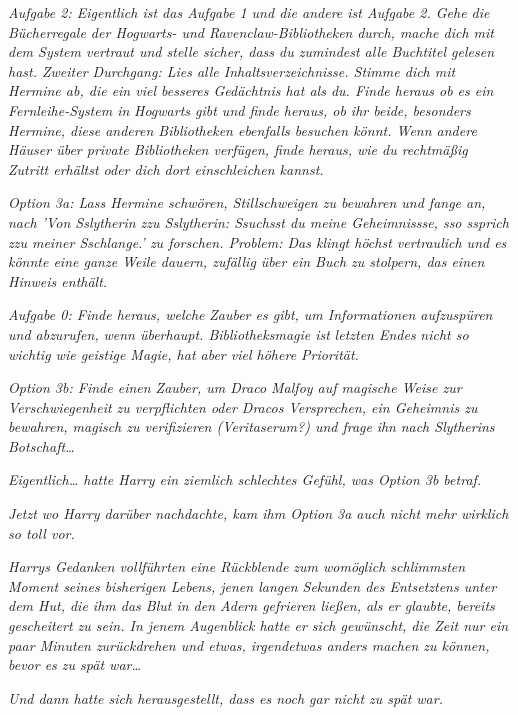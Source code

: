 {\emph{\emph{Aufgabe 2: Eigentlich ist das Aufgabe 1 und die andere ist Aufgabe 2. Gehe die Bücherregale der Hogwarts- und Ravenclaw-Bibliotheken}} \emph{\emph{durch}\emph{, mache dich mit dem System vertraut und stelle sicher, dass du zumindest alle Buchtitel gelesen hast. Zweiter Durchgang: Lies alle Inhaltsverzeichnisse. Stimme dich mit Hermine ab, die ein viel besseres Gedächtnis hat als du. Finde heraus ob es ein Fernleihe-System in}} \emph{\emph{Hogwarts gibt und finde heraus, ob ihr beide, besonders Hermine, diese anderen Bibliotheken ebenfalls besuchen könnt. Wenn andere Häuser über private Bibliotheken verfügen, finde heraus, wie du rechtmäßig Zutritt erhältst oder dich dort einschleichen kannst.}}

\emph{\emph{Option 3a: Lass Hermine schwören, Stillschweigen zu bewahren und fange an, nach '}\emph{V}\emph{on Sslytherin zzu Sslytherin: Ssuchsst du meine Geheimnissse, sso s}\emph{s}\emph{prich zzu meiner Sschlange.}\emph{' zu forschen. Problem: Das klingt höchst vertraulich und es könnte eine ganze Weile dauern, zufällig über ein Buch zu stolpern, das einen Hinweis enthält.}}

\emph{\emph{Aufgabe 0: Finde heraus, w}\emph{elche}} \emph{\emph{Zauber es gibt, um Informationen aufzuspüren und abzurufen,}} \emph{\emph{wenn überhaupt}\emph{. Bibliotheksmagie ist}} \emph{\emph{letzten Endes}} \emph{\emph{nicht so wichtig wie geistige Magie, hat aber viel höhere Priorität.}}

\emph{\emph{Option 3b: Finde einen Zauber, um Draco Malfoy auf magische Weise zur Verschwiegenheit zu verpflichten oder Dracos Versprechen, ein Geheimnis zu bewahren, magisch zu verifizieren (Veritaserum?) und frage}} \emph{ihn} \emph{\emph{nach Slytherins Botschaft…}}

\emph{Eigentlich… hatte Harry ein ziemlich schlechtes Gefühl, was Option 3b betraf.}

\emph{Jetzt wo Harry darüber nachdachte, kam ihm Option 3a auch nicht mehr wirklich so toll vor.}

\emph{Harrys Gedanken vollführten eine Rückblende zum womöglich schlimmsten Moment seines bisherigen Lebens, jenen langen Sekunden des Entsetztens unter dem Hut, die ihm das Blut in den Adern gefrieren ließen, als er glaubte, bereits gescheitert zu sein. In jenem Augenblick hatte er sich gewünscht, die Zeit nur ein paar Minuten zurückdrehen und etwas, irgendetwas anders machen zu können, bevor es zu spät war…}

\emph{Und dann hatte sich herausgestellt, dass es noch gar nicht zu spät war.}

}
